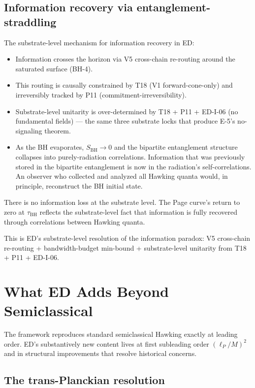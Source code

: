 \documentclass[11pt,a4paper]{article}
\begin{document}
\subsection{Information recovery via entanglement-straddling}

The substrate-level mechanism for information recovery in ED:

\begin{itemize}[noitemsep]
  \item Information crosses the horizon via V5 cross-chain re-routing around the saturated surface (BH-4).
  \item This routing is causally constrained by T18 (V1 forward-cone-only) and irreversibly tracked by P11 (commitment-irreversibility).
  \item Substrate-level unitarity is over-determined by T18 + P11 + ED-I-06 (no fundamental fields) --- the same three substrate locks that produce E-5's no-signaling theorem.
  \item As the BH evaporates, $S_{\mathrm{BH}} \to 0$ and the bipartite entanglement structure collapses into purely-radiation correlations. Information that was previously stored in the bipartite entanglement is now in the radiation's self-correlations. An observer who collected and analyzed all Hawking quanta would, in principle, reconstruct the BH initial state.
\end{itemize}

There is no information loss at the substrate level. The Page curve's return to zero at $\tau_{\mathrm{BH}}$ reflects the substrate-level fact that information is fully recovered through correlations between Hawking quanta.

This is ED's substrate-level resolution of the information paradox: V5 cross-chain re-routing + bandwidth-budget min-bound + substrate-level unitarity from T18 + P11 + ED-I-06.

\section{What ED Adds Beyond Semiclassical}

The framework reproduces standard semiclassical Hawking exactly at leading order. ED's substantively new content lives at first subleading order $(\ell_P/M)^2$ and in structural improvements that resolve historical concerns.

\subsection{The trans-Planckian resolution}
\end{document}
